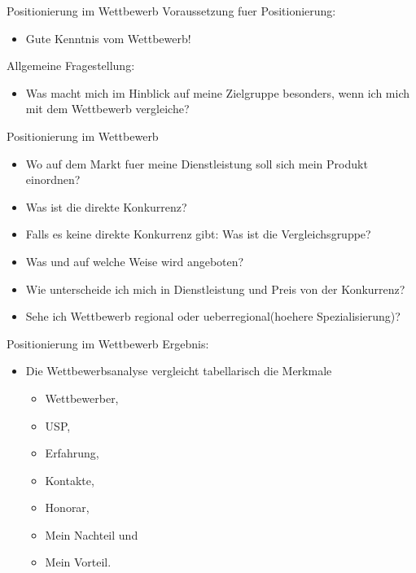 
\begin{frame}{Positionierung im Wettbewerb}
  Voraussetzung fuer Positionierung:
  \begin{itemize}
  \item Gute Kenntnis vom Wettbewerb!
  \end{itemize}
  Allgemeine Fragestellung:
  \begin{itemize}
    \item Was macht mich im Hinblick auf meine Zielgruppe besonders, wenn ich mich mit dem Wettbewerb vergleiche?
  \end{itemize}
  
\end{frame}

\begin{frame}{Positionierung im Wettbewerb}
  \begin{itemize}
  \item Wo auf dem Markt fuer meine Dienstleistung soll sich mein Produkt einordnen?
  \item Was ist die direkte Konkurrenz?
  \item Falls es keine direkte Konkurrenz gibt: Was ist die Vergleichsgruppe?
  \item Was und auf welche Weise wird angeboten?
  \item Wie unterscheide ich mich in Dienstleistung und Preis von der Konkurrenz?
  \item Sehe ich Wettbewerb regional oder ueberregional(hoehere Spezialisierung)?
  \end{itemize}
\end{frame}

\begin{frame}{Positionierung im Wettbewerb}
  Ergebnis:
  \begin{itemize}
  \item Die Wettbewerbsanalyse vergleicht tabellarisch die Merkmale
    \begin{itemize}
    \item Wettbewerber,
    \item USP,
    \item Erfahrung,
    \item Kontakte,
    \item Honorar,
    \item Mein Nachteil und
    \item Mein Vorteil.
    \end{itemize}
  \end{itemize}
\end{frame}
